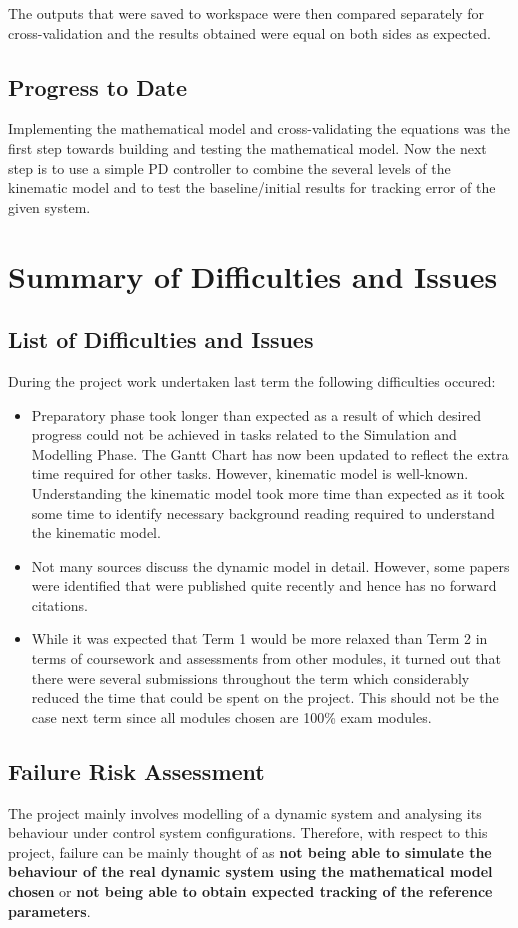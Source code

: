 \documentclass[a4paper,12pt]{report}
\begin{document}
The outputs that were saved to workspace were then compared separately for cross-validation and the results obtained were equal on both sides as expected. 
 
\section{Progress to Date}
Implementing the mathematical model and cross-validating the equations was the first step towards building and testing the mathematical model. Now the next step is to use a simple PD controller to combine the several levels of the kinematic model and to test the baseline/initial results for tracking error of the given system.


\chapter{Summary of Difficulties and Issues}
\section{List of Difficulties and Issues} 
During the project work undertaken last term the following difficulties occured:
\begin{itemize}
	\item Preparatory phase took longer than expected as a result of which desired progress could not be achieved in tasks related to the Simulation and Modelling Phase. The Gantt Chart has now been updated to reflect the extra time required for other tasks. However, kinematic model is well-known. Understanding the kinematic model took more time than expected as it took some time to identify necessary background reading required to understand the kinematic model.
	\item Not many sources discuss the dynamic model in detail. However, some papers were identified that were published quite recently and hence has no forward citations.
	\item While it was expected that Term 1 would be more relaxed than Term 2 in terms of coursework and assessments from other modules, it turned out that there were several submissions throughout the term which considerably reduced the time that could be spent on the project. This should not be the case next term since all modules chosen are 100\% exam modules.
\end{itemize}
\section{Failure Risk Assessment}
The project mainly involves modelling of a dynamic system and analysing its behaviour under control system configurations. Therefore, with respect to this project, failure can be mainly thought of as \textbf{not being able to simulate the behaviour of the real dynamic system using the mathematical model chosen} or \textbf{not being able to obtain expected tracking of the reference parameters}.
\end{document}
